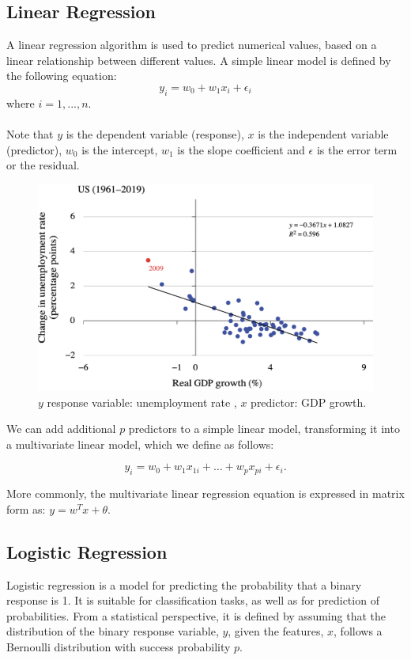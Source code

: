 \documentclass[../main.tex]{subfiles}
\begin{document}
	\subsection{Linear Regression}
	\noindent A linear regression algorithm is used to predict numerical values, based on a linear relationship between different values. A simple linear model is defined by the following equation:
	$$ y_i=  w_0 +w_1 x_i +\epsilon_i  $$
	\noindent where $ i = 1, ..., n$.  \\ \\ 
	Note that $y$ is the dependent variable (response), $x$ is the independent variable (predictor), $w_0$ is the intercept, $w_1$ is the slope coefficient and $\epsilon$ is the error term or the residual. \\ 
	\begin{figure}[h]
		\centering
		\includegraphics[width=0.6\linewidth]{imgs/gdp.png}
		 \caption{\small $y$ response variable: unemployment rate , $x$ predictor: GDP growth. \cite{economy2023}} 
	\end{figure} \mbox{} \par
\vspace{\baselineskip} 
\noindent We can add additional $p$ predictors to a simple linear model, transforming it into a multivariate linear model, which we define as follows:

$$y_i = w_0 + w_1x_{1i} + \ldots + w_px_{pi} + \epsilon_i. $$

\noindent More commonly, the multivariate linear regression equation is expressed in matrix form as: $y = w^T x + \theta $.



\subsection{Logistic Regression}
\noindent Logistic regression is a model for predicting the probability that a binary response is 1.  It is suitable for classification tasks, as well as for prediction of probabilities.  From a statistical perspective, it is defined by assuming that the distribution of the binary response variable, $y$, given the features, $x$, follows a Bernoulli
distribution with success probability $p$. 
\end{document}
